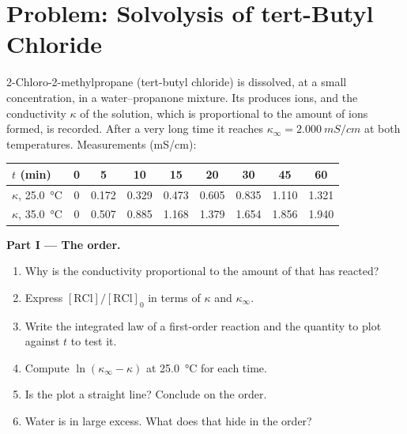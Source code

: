 \section{Problem: Solvolysis of tert-Butyl Chloride}

\begin{problem}
\label{pb:b1:nucleophilic-substitution:1}
2-Chloro-2-methylpropane (tert-butyl chloride) is dissolved, at a small
concentration, in a water--propanone mixture. Its 
 produces ions, and the
conductivity $\kappa$ of the solution, which is proportional to the
amount of ions formed, is recorded. After a very long time it reaches
$\kappa_\infty = \qty{2.000}{mS/cm}$ at both temperatures. Measurements
(\unit{mS/cm}):

\begin{center}
\begin{tabular}{lcccccccc}
\hline
$t$ (min) & 0 & 5 & 10 & 15 & 20 & 30 & 45 & 60 \\
\hline
$\kappa$, \qty{25.0}{\celsius} & 0 & 0.172 & 0.329 & 0.473 & 0.605 & 0.835 & 1.110 & 1.321 \\
$\kappa$, \qty{35.0}{\celsius} & 0 & 0.507 & 0.885 & 1.168 & 1.379 & 1.654 & 1.856 & 1.940 \\
\hline
\end{tabular}
\end{center}

\medskip
\noindent\textbf{Part I --- The order.}
\begin{enumerate}
  \item Why is the conductivity proportional to the amount of 
        that has reacted?
  \item Express $[\mathrm{RCl}]/[\mathrm{RCl}]_0$ in terms of $\kappa$ and
        $\kappa_\infty$.
  \item Write the integrated law of a first-order reaction and the
        quantity to plot against $t$ to test it.
  \item Compute $\ln(\kappa_\infty - \kappa)$ at \qty{25.0}{\celsius} for each
        time.
  \item Is the plot a straight line? Conclude on the order.
  \item Water is in large excess. What does that hide in the order?
\end{enumerate}


\end{problem}
